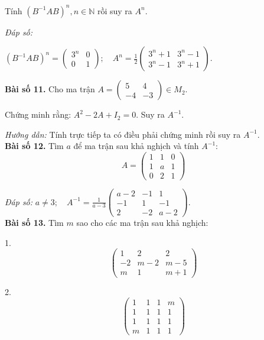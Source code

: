     Tính \((B^{-1}AB)^n, n \in \mathbb{N}\) rồi suy ra \(A^n\).

    \textit{Đáp số:}
    
    \((B^{-1}AB)^n = \begin{pmatrix}
        3^n & 0 \\
        0 & 1
        \end{pmatrix}; \quad A^n = \frac{1}{2} \begin{pmatrix}
        3^n + 1 & 3^n - 1 \\
        3^n - 1 & 3^n + 1
        \end{pmatrix}\).
        
        
\textbf{Bài số 11.} Cho ma trận \(A = \begin{pmatrix}
        5 & 4 \\
        -4 & -3
        \end{pmatrix} \in M_2 \).
        
        Chứng minh rằng: \(A^2 - 2A + I_2 = 0\). Suy ra \(A^{-1}\).
        
        \textit{Hướng dẫn:} Tính trực tiếp ta có điều phải chứng minh rồi suy ra \(A^{-1}\).\\
\textbf{Bài số 12.} Tìm \(a\) để ma trận sau khả nghịch và tính \(A^{-1}\):
        \[
        A = \begin{pmatrix}
        1 & 1 & 0 \\
        1 & a & 1 \\
        0 & 2 & 1
        \end{pmatrix}
        \]
        
        \textit{Đáp số:} \(a \neq 3; \quad A^{-1} = \frac{1}{a - 3} \begin{pmatrix}
        a - 2 & -1 & 1 \\
        -1 & 1 & -1 \\
        2 & -2 & a - 2
        \end{pmatrix}\).\\     
\textbf{Bài số 13.} Tìm \(m\) sao cho các ma trận sau khả nghịch:
        
        1.
        \[
        \begin{pmatrix}
        1 & 2 & 2 \\
        -2 & m - 2 & m - 5 \\
        m & 1 & m + 1
        \end{pmatrix}
        \]
        
        2.
        \[
        \begin{pmatrix}
        1 & 1 & 1 & m \\
        1 & 1 & 1 & 1 \\
        1 & 1 & 1 & 1 \\
        m & 1 & 1 & 1
        \end{pmatrix}
        \]
        
